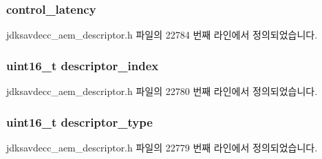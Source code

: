 \subsubsection[{\texorpdfstring{control\+\_\+latency}{control_latency}}]{ control\+\_\+latency}\hypertarget{structjdksavdecc__descriptor__signal__multiplexer_ab2bd4639caaf9a8078b68368afbd63b6}{}\label{structjdksavdecc__descriptor__signal__multiplexer_ab2bd4639caaf9a8078b68368afbd63b6}


jdksavdecc\+\_\+aem\+\_\+descriptor.\+h 파일의 22784 번째 라인에서 정의되었습니다.

\subsubsection[{\texorpdfstring{descriptor\+\_\+index}{descriptor_index}}]{\setlength{\rightskip}{0pt plus 5cm}uint16\+\_\+t descriptor\+\_\+index}\hypertarget{structjdksavdecc__descriptor__signal__multiplexer_a042bbc76d835b82d27c1932431ee38d4}{}\label{structjdksavdecc__descriptor__signal__multiplexer_a042bbc76d835b82d27c1932431ee38d4}


jdksavdecc\+\_\+aem\+\_\+descriptor.\+h 파일의 22780 번째 라인에서 정의되었습니다.

\subsubsection[{\texorpdfstring{descriptor\+\_\+type}{descriptor_type}}]{\setlength{\rightskip}{0pt plus 5cm}uint16\+\_\+t descriptor\+\_\+type}\hypertarget{structjdksavdecc__descriptor__signal__multiplexer_ab7c32b6c7131c13d4ea3b7ee2f09b78d}{}\label{structjdksavdecc__descriptor__signal__multiplexer_ab7c32b6c7131c13d4ea3b7ee2f09b78d}


jdksavdecc\+\_\+aem\+\_\+descriptor.\+h 파일의 22779 번째 라인에서 정의되었습니다.


